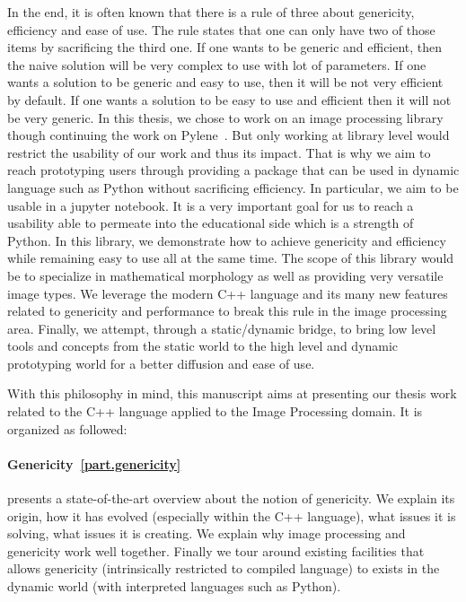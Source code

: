 
In the end,  it is often known that there is a rule of three about genericity, efficiency and
ease of use. The rule states that one can only have two of those items by sacrificing the third one. If one wants to be
generic and efficient, then the naive solution will be very complex to use with lot of parameters. If one wants a
solution to be generic and easy to use, then it will be not very efficient by default. If one wants a solution to be
easy to use and efficient then it will not be very generic. In this thesis, we chose to work on an image processing
library though continuing the work on Pylene~\cite{carlinet.2018.pylena}. But only working at library level would
restrict the usability of our work and thus its impact. That is why we aim to reach prototyping users through providing
a package that can be used in dynamic language such as Python without sacrificing efficiency. In particular, we aim to
be usable in a jupyter notebook. It is a very important goal for us to reach a usability able to permeate into the
educational side which is a strength of Python. In this library, we demonstrate how to achieve genericity and efficiency
while remaining easy to use all at the same time. The scope of this library would be to specialize in mathematical
morphology as well as providing very versatile image types. We leverage the modern C++ language and its many new
features related to genericity and performance to break this rule in the image processing area. Finally, we attempt,
through a static/dynamic bridge, to bring low level tools and concepts from the static world to the high level and
dynamic prototyping world for a better diffusion and ease of use.

With this philosophy in mind, this manuscript aims at presenting our thesis work related to the C++ language applied to
the Image Processing domain. It is organized as followed:

\paragraph{Genericity~\ref{part.genericity}} presents a state-of-the-art overview about the notion of genericity. We
explain its origin, how it has evolved (especially within the C++ language), what issues it is solving, what issues it
is creating. We explain why image processing and genericity work well together. Finally we tour around existing
facilities that allows genericity (intrinsically restricted to compiled language) to exists in the dynamic world (with
interpreted languages such as Python).

